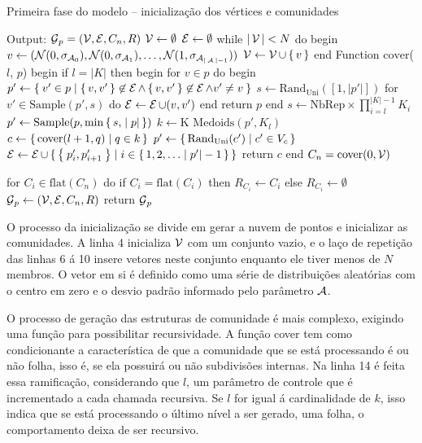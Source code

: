 \documentclass[notes.tex]{subfiles}
\begin{document}
\begin{quadro}[htbp]
\caption{Primeira fase do modelo -- inicialização dos vértices e comunidades}
\label{qua:fase_1}
\begin{algorithm}
Output: $\operatorname{\mathcal{G}}_p = (\operatorname{\mathcal{V}}, \operatorname{\mathcal{E}}, C_n, R)$
$\operatorname{\mathcal{V}} \leftarrow \emptyset$
$\operatorname{\mathcal{E}} \leftarrow \emptyset$
while $|\operatorname{\mathcal{V}}| < N$ do
begin
    $v \leftarrow (\mathcal{N}(0, \sigma_{\operatorname{\mathcal{A}}_0}), \mathcal{N}(0, \sigma_{\operatorname{\mathcal{A}}_1}), \ldots, \mathcal{N}(1, \sigma_{\operatorname{\mathcal{A}}_{|\operatorname{\mathcal{A}}|-1}}))$
    $\operatorname{\mathcal{V}} \leftarrow \operatorname{\mathcal{V}} \cup \set{v}$
end
Function $\text{cover}$($l$, $p$)
begin
    if $l = |K|$ then
    begin
        for $v \in p$ do
        begin
            $p' \leftarrow \Set{v' \in p | \set{v, v'} \not\in \operatorname{\mathcal{E}}\land \set{v, v'} \not\in \operatorname{\mathcal{E}}\land v' \neq v}$
            $s \leftarrow \text{Rand}_\text{Uni}([1, |p'|])$
            for $v'\in \text{Sample}(p', s)$ do $\operatorname{\mathcal{E}} \leftarrow \operatorname{\mathcal{E}} \cup (v, v')$
        end
        return $p$
    end
    $s \leftarrow \text{NbRep}\times\prod_{i=l}^{|K|-1} K_i$
    $p' \leftarrow \text{Sample}(p, \min\set{s, |p|})$
    $k \leftarrow \text{K Medoids}(p', K_l)$ 
    $c \leftarrow \set{\text{cover}(l+1, q) | q \in k}$
    $p' \leftarrow \set{\text{Rand}_\text{Uni}(c') | c' \in V_c}$
    $\operatorname{\mathcal{E}} \leftarrow \operatorname{\mathcal{E}} \cup \set{\Set{p'_i, p'_{i+1}}| i \in \set{1, 2, \ldots |p'| -1}}$
    return $c$
end
$C_n = \text{cover}(0, \operatorname{\mathcal{V}})$

for $C_i \in \text{flat}(C_n)$ do
    if $C_i = \text{flat}(C_i)$ then $R_{C_i} \leftarrow C_i$
    else $R_{C_i} \leftarrow \emptyset$
$\operatorname{\mathcal{G}}_p \leftarrow (\operatorname{\mathcal{V}}, \operatorname{\mathcal{E}}, C_n, R)$
return $\operatorname{\mathcal{G}}_p$
\end{algorithm}
\end{quadro}

O processo da inicialização se divide em gerar a nuvem de pontos e inicializar as comunidades.
A linha 4 inicializa $\operatorname{\mathcal{V}}$ com um conjunto vazio, e o laço de repetição das linhas 6 á 10 insere vetores neste conjunto enquanto ele tiver menos de  $N$ membros.
O vetor em si é definido como uma série de distribuições aleatórias com o centro em zero e o desvio padrão informado pelo parâmetro $\operatorname{\mathcal{A}}$.

O processo de geração das estruturas de comunidade é mais complexo, exigindo uma função para possibilitar recursividade.
A função cover tem como condicionante a característica de que a comunidade que se está processando é ou não folha, isso é, se ela possuirá ou não subdivisões internas.
Na linha 14 é feita essa ramificação, considerando que $l$, um parâmetro de controle que é incrementado a cada chamada recursiva.
Se $l$ for igual á cardinalidade de $k$, isso indica que se está processando o último nível a ser gerado, uma folha, o comportamento deixa de ser recursivo.
\end{document}
